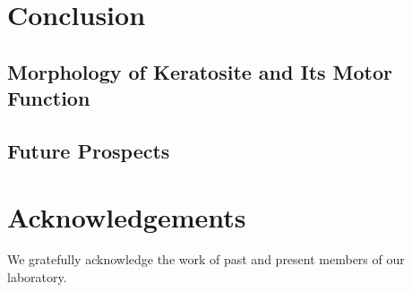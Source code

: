 \documentclass[a4paper,12pt]{book}
\begin{document}
\chapter{Conclusion}
\section{Morphology of Keratosite and Its Motor Function}

\section{Future Prospects}

\chapter*{Acknowledgements}
We gratefully acknowledge the work of past and present members of our laboratory.




\end{document}
